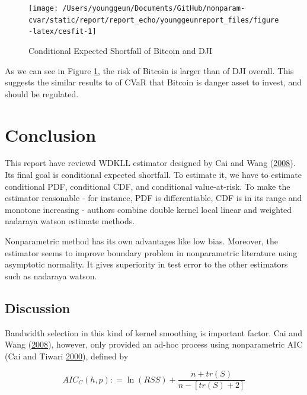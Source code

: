 \documentclass[
]{article}
\theoremstyle{definition}
\theoremstyle{definition}
\theoremstyle{definition}
\theoremstyle{remark}
\begin{document}
\begin{figure}[H]

{\centering \texttt{[image: /Users/younggeun/Documents/GitHub/nonparam-cvar/static/report/report\_echo/younggeunreport\_files/figure-latex/cesfit-1]} 

}

\caption{Conditional Expected Shortfall of Bitcoin and DJI}\label{fig:cesfit}
\end{figure}

As we can see in Figure \ref{fig:cesfit}, the risk of Bitcoin is larger than of DJI overall. This suggests the similar results to of CVaR that Bitcoin is danger asset to invest, and should be regulated.

\hypertarget{conclusion}{%
\section{Conclusion}\label{conclusion}}

This report have reviewd WDKLL estimator designed by Cai and Wang (\protect\hyperlink{ref-cai:2008aa}{2008}). Its final goal is conditional expected shortfall. To estimate it, we have to estimate conditional PDF, conditional CDF, and conditional value-at-risk. To make the estimator reasonable - for instance, PDF is differentiable, CDF is in its range and monotone increasing - authors combine double kernel local linear and weighted nadaraya watson estimate methods.

Nonparametric method has its own advantages like low bias. Moreover, the estimator seems to improve boundary problem in nonparametric literature using asymptotic normality. It gives superiority in test error to the other estimators such as nadaraya watson.

\hypertarget{discussion}{%
\subsection{Discussion}\label{discussion}}

Bandwidth selection in this kind of kernel smoothing is important factor. Cai and Wang (\protect\hyperlink{ref-cai:2008aa}{2008}), however, only provided an ad-hoc process using nonparametric AIC (Cai and Tiwari \protect\hyperlink{ref-cai2000application}{2000}), defined by

\begin{equation}
  AIC_{C}(h,p) \mathpunct{:}=\ln (RSS) + \frac{n + tr(S)}{n - \left[ tr(S) + 2 \right]}
  \label{eq:nonparamaic}
\end{equation}
\end{document}
